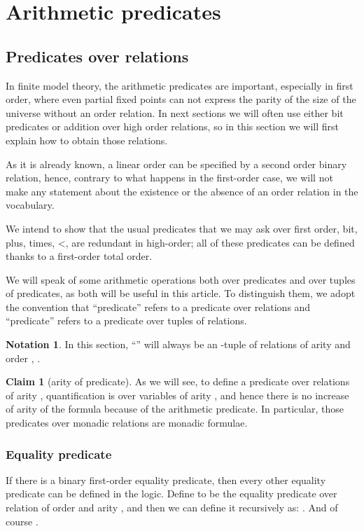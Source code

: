 \documentclass[a4paper,12pt]{article}
\newcommand{\sss}[1]{\subsubsection{#1}}
\theoremstyle{definition}
\newtheorem{claim}[theorem]{Claim}
\newtheorem{notation}[theorem]{Notation}
\begin{document}
\section{Arithmetic predicates}\label{arith}
\subsection{Predicates over relations}
In finite model theory, the arithmetic predicates are important,
especially in first order, where even partial fixed points can not
express the parity of the size of the universe without an order
relation. In next sections we will often use either bit predicates or
addition over high order relations, so in this section we will first
explain how to obtain those relations.

As it is already known, a linear order can be specified by a second
order binary relation, hence, contrary to what happens in the
first-order case, we will not make any statement about the
existence or the absence of an order relation in the vocabulary.

We intend to show that the usual predicates that we may ask over first
order, bit, plus, times, <, are redundant in high-order; all of these
predicates can be defined thanks to a first-order total order.

We will speak of some arithmetic operations both over predicates and
over tuples of predicates, as both will be useful in this article. To
distinguish them, we adopt the convention that ``predicate''
refers to a predicate over relations and ``predicate'' refers
to a predicate over tuples of relations.

\begin{notation}
  In this section, ``'' will always be an -tuple of
  relations of arity  and order , .
\end{notation}

\begin{claim}[arity of predicate]\label{mon-pred}
  As we will see, to define a predicate over relations of arity ,
  quantification is over variables of arity , and hence there is no
  increase of arity of the formula because of the arithmetic
  predicate. In particular, those predicates over monadic relations
  are monadic formulae.
\end{claim}

\sss{Equality predicate}
If there is a binary first-order equality predicate, then every other
equality predicate can be defined in the logic. Define  to be
the equality predicate over relation of order  and arity , and
then we can define it recursively as: . And of course .
\end{document}
